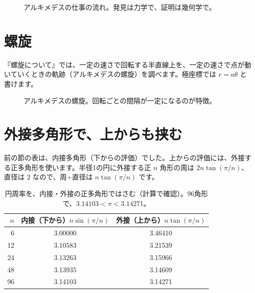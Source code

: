 \documentclass[a4paper,11pt,openany]{ltjsbook}
\begin{document}
\begin{figure}[htbp]
\centering
{}
\caption{アルキメデスの仕事の流れ。発見は力学で、証明は幾何学で。}
\end{figure}

\section{螺旋}

『螺旋について』では、一定の速さで回転する半直線上を、一定の速さで点が動いていくときの軌跡（アルキメデスの螺旋）を調べます。極座標では $r=a\theta$ と書けます。

\begin{figure}[htbp]
\centering
{}
\caption{アルキメデスの螺旋。回転ごとの間隔が一定になるのが特徴。}
\end{figure}

\section{外接多角形で、上からも挟む}

前の節の表は、内接多角形（下からの評価）でした。上からの評価には、外接する正多角形を使います。半径1の円に外接する正 $n$ 角形の周は $2n\tan(\pi/n)$、直径は $2$ なので、周÷直径は $n\tan(\pi/n)$ です。

\begin{table}[htbp]
\centering
\begin{tabular}{rcc}
\toprule
$n$ & 内接（下から）$n\sin(\pi/n)$ & 外接（上から）$n\tan(\pi/n)$\\
\midrule
6 & 3.00000 & 3.46410\\
12 & 3.10583 & 3.21539\\
24 & 3.13263 & 3.15966\\
48 & 3.13935 & 3.14609\\
96 & 3.14103 & 3.14271\\
\bottomrule
\end{tabular}
\caption{円周率を、内接・外接の正多角形ではさむ（計算で確認）。96角形で、$3.14103<\pi<3.14271$。}
\end{table}
\end{document}
